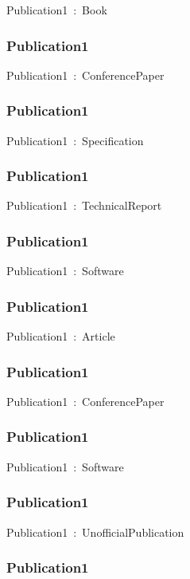 \documentclass{article}
\begin{document}
Publication1~:~Book

\subsubsection*{Publication1}

Publication1~:~ConferencePaper

\subsubsection*{Publication1}

Publication1~:~Specification

\subsubsection*{Publication1}

Publication1~:~TechnicalReport

\subsubsection*{Publication1}

Publication1~:~Software

\subsubsection*{Publication1}

Publication1~:~Article

\subsubsection*{Publication1}

Publication1~:~ConferencePaper

\subsubsection*{Publication1}

Publication1~:~Software

\subsubsection*{Publication1}

Publication1~:~UnofficialPublication

\subsubsection*{Publication1}
\end{document}
